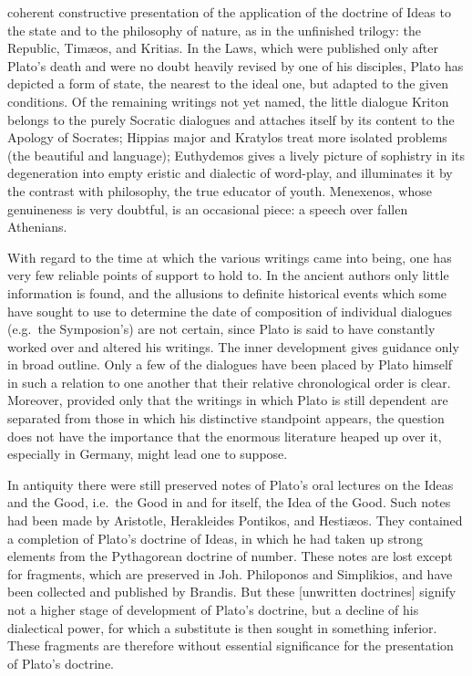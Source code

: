 coherent constructive presentation of the application of the doctrine of
Ideas to the state and to the philosophy of nature, as in the unfinished
trilogy: the Republic, Timæos, and Kritias. In the Laws, which were
published only after Plato's death and were no doubt heavily revised by one
of his disciples, Plato has depicted a form of state, the nearest to the
ideal one, but adapted to the given conditions. Of the remaining writings
not yet named, the little dialogue Kriton belongs to the purely Socratic
dialogues and attaches itself by its content to the Apology of Socrates;
Hippias major and Kratylos treat more isolated problems (the beautiful and
language); Euthydemos gives a lively picture of sophistry in its
degeneration into empty eristic and dialectic of word-play, and illuminates
it by the contrast with philosophy, the true educator of youth. Menexenos,
whose genuineness is very doubtful, is an occasional piece: a speech over
fallen Athenians.

With regard to the time at which the various writings came into being, one
has very few reliable points of support to hold to. In the ancient authors
only little information is found, and the allusions to definite historical
events which some have sought to use to determine the date of composition of
individual dialogues (e.g.\ the Symposion's) are not certain, since Plato is
said to have constantly worked over and altered his writings. The
inner development gives guidance only in broad outline. Only a few of the
dialogues have been placed by Plato himself in such a relation to one
another that their relative chronological order is clear. Moreover,
provided only that the writings in which Plato is still dependent are
separated from those in which his distinctive standpoint appears, the
question does not have the importance that the enormous literature heaped up
over it, especially in Germany, might lead one to suppose.

In antiquity there were still preserved notes of Plato's oral lectures on
the Ideas and the Good, i.e.\ the Good in and for itself, the Idea of the
Good. Such notes had been made by Aristotle, Herakleides Pontikos, and
Hestiæos. They contained a completion of Plato's doctrine of Ideas, in which
he had taken up strong elements from the Pythagorean doctrine of number.
These notes are lost except for fragments, which are preserved in Joh.
Philoponos and Simplikios, and have been collected and published by Brandis.
But these  [unwritten doctrines] signify not a higher stage
of development of Plato's doctrine, but a decline of his dialectical power,
for which a substitute is then sought in something inferior. These fragments
are therefore without essential significance for the presentation of
Plato's doctrine.


